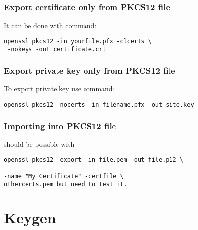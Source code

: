 \documentclass{report}
\begin{document}
\subsection{Export certificate only from PKCS12 file}
It can be done with command:
\begin{verbatim}
openssl pkcs12 -in yourfile.pfx -clcerts \
 -nokeys -out certificate.crt 
\end{verbatim}

\subsection{Export private key only from PKCS12 file}
To export private key use command:
\begin{verbatim}
openssl pkcs12 -nocerts -in filename.pfx -out site.key
\end{verbatim}

\subsection{Importing into PKCS12 file}
should be possible with 
\begin{verbatim}
openssl pkcs12 -export -in file.pem -out file.p12 \

-name "My Certificate" -certfile \
othercerts.pem but need to test it.
\end{verbatim}



\chapter{Keygen}
\end{document}

